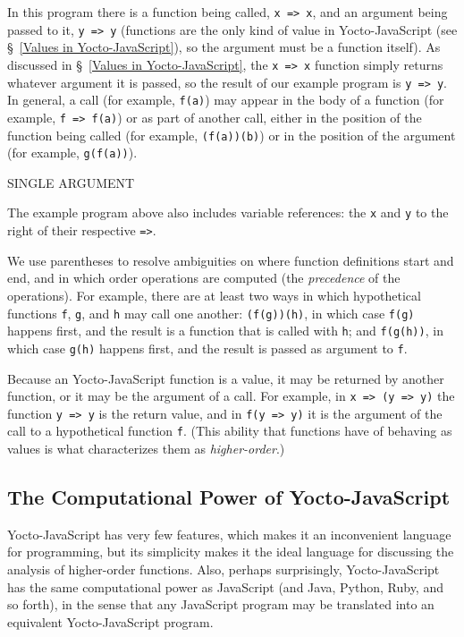 \documentclass[12pt, oneside]{book}
\begin{document}
In this program there is a function being called, \texttt{x => x}, and an argument being passed to it, \texttt{y => y} (functions are the only kind of value in Yocto-JavaScript (see §~\ref{Values in Yocto-JavaScript}), so the argument must be a function itself). As discussed in §~\ref{Values in Yocto-JavaScript}, the \texttt{x => x} function simply returns whatever argument it is passed, so the result of our example program is \texttt{y => y}. In general, a call (for example, \texttt{f(a)}) may appear in the body of a function (for example, \texttt{f => f(a)}) or as part of another call, either in the position of the function being called (for example, \texttt{(f(a))(b)}) or in the position of the argument (for example, \texttt{g(f(a))}).

SINGLE ARGUMENT

The example program above also includes variable references: the \texttt{x} and \texttt{y} to the right of their respective \texttt{=>}.

We use parentheses to resolve ambiguities on where function definitions start and end, and in which order operations are computed (the \emph{precedence} of the operations). For example, there are at least two ways in which hypothetical functions \texttt{f}, \texttt{g}, and \texttt{h} may call one another: \texttt{(f(g))(h)}, in which case \texttt{f(g)} happens first, and the result is a function that is called with \texttt{h}; and \texttt{f(g(h))}, in which case \texttt{g(h)} happens first, and the result is passed as argument to \texttt{f}.

Because an Yocto-JavaScript function is a value, it may be returned by another function, or it may be the argument of a call. For example, in \texttt{x => (y => y)} the function \texttt{y => y} is the return value, and in \texttt{f(y => y)} it is the argument of the call to a hypothetical function \texttt{f}. (This ability that functions have of behaving as values is what characterizes them as \emph{higher-order}.)

\subsection{The Computational Power of Yocto-JavaScript}

Yocto-JavaScript has very few features, which makes it an inconvenient language for programming, but its simplicity makes it the ideal language for discussing the analysis of higher-order functions. Also, perhaps surprisingly, Yocto-JavaScript has the same computational power as JavaScript (and Java, Python, Ruby, and so forth), in the sense that any JavaScript program may be translated into an equivalent Yocto-JavaScript program.
\end{document}
